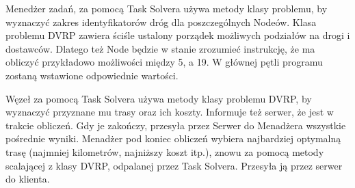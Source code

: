 \documentclass[12pt,a4paper,titlepage]{report}
\begin{document}
		Menedżer zadań, za pomocą Task Solvera używa metody klasy problemu, by wyznaczyć zakres identyfikatorów dróg dla poszczególnych Nodeów. Klasa problemu DVRP zawiera ściśle ustalony porządek możliwych podziałów na drogi i dostawców. Dlatego też Node będzie w stanie zrozumieć instrukcję, że ma obliczyć przykładowo możliwości między 5, a 19. W głównej pętli programu zostaną wstawione odpowiednie wartości.
		
		Węzeł za pomocą Task Solvera używa metody klasy problemu DVRP, by wyznaczyć przyznane mu trasy oraz ich koszty. Informuje też serwer, że jest w trakcie obliczeń. Gdy je zakończy, przesyła przez Serwer do Menadżera wszystkie pośrednie wyniki. Menadżer pod koniec obliczeń wybiera najbardziej optymalną trasę (najmniej kilometrów, najniższy koszt  itp.), znowu za pomocą metody scalającej z klasy DVRP, odpalanej przez Task Solvera. Przesyła ją przez serwer do klienta.
		
\end{document}
